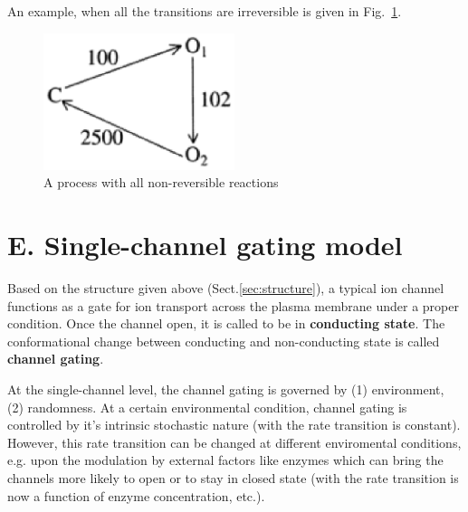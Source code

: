 An example, when all the transitions are irreversible is given in
Fig.~\ref{fig:irreversible}.

\begin{figure}[hbt]
  \centerline{\includegraphics[height=4cm,
    angle=0]{./images/irreversible.eps}}
  \caption{A process with all non-reversible reactions}
\label{fig:irreversible}
\end{figure}




%
%
%

\section{E. Single-channel gating model}
\label{sec:single_channel_gating}
\label{sec:conductance-levels}
\label{sec:channel-gating}

Based on the structure given above (Sect.\ref{sec:structure}), a typical ion
channel functions as a gate for ion transport across the plasma membrane under a
proper condition. Once the channel open, it is called to be in {\bf conducting
state}. The conformational change between conducting and non-conducting state is
called {\bf channel gating}.

At the single-channel level, the channel gating is governed by (1) environment,
(2) randomness. At a certain environmental condition, channel gating is
controlled by it's intrinsic stochastic nature (with the rate transition is
constant). However, this rate transition can be changed at different
enviromental conditions, e.g. upon the modulation by external factors like
enzymes which can bring the channels more likely to open or to stay in closed
state (with the rate transition is now a function of enzyme concentration,
etc.).

